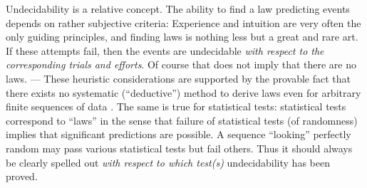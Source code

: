       Undecidability is a relative concept.  The ability to find a law
 predicting events depends on rather subjective criteria: Experience
 and intuition are very often the only guiding principles, and finding
 laws is nothing less but a great and rare art.  If these
 attempts fail, then the events are undecidable {\sl with respect to
 the
 corresponding trials and efforts}.  Of course that does not imply that
 there are no laws. --- These heuristic considerations are supported by
 the provable fact that there exists no systematic (``deductive'')
 method to derive laws even for arbitrary finite sequences of data
 \cite{r3}.  The same is true for statistical tests: statistical
 tests correspond to ``laws'' in the sense that failure of
 statistical tests (of randomness) implies that significant predictions
 are
 possible.  A sequence ``looking'' perfectly random may pass various
 statistical tests but fail others.  Thus it should always be clearly
 spelled out {\sl with respect to which test(s)} undecidability has
 been proved.

